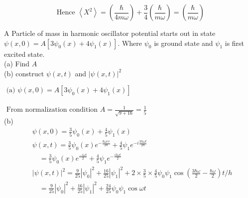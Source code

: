 \begin{enumerate}
\begin{answer}
$$\text { Hence }\left\langle X^{2}\right\rangle=\left(\frac{\hbar}{4 m \omega}\right)+\frac{3}{4}\left(\frac{\hbar}{m \omega}\right)=\left(\frac{\hbar}{m \omega}\right)$$
\end{answer}
	\begin{minipage}{\textwidth}
	\item A Particle of mass in harmonic oscillator potential starts out in state $\psi(x, 0)=A\left[3 \psi_{0}(x)+4 \psi_{1}(x)\right] .$ Where $\psi_{0}$ is ground state and $\psi_{1}$ is first excited state.\\
	(a) Find $A$\\
	(b) construct $\psi(x, t)$ and $|\psi(x, t)|^{2}$\\
\end{minipage}
\begin{answer}
	$\text { (a) } \psi(x, 0)=A\left[3 \psi_{0}(x)+4 \psi_{1}(x)\right]$\\\\
	$\text { From normalization condition } A=\frac{1}{\sqrt{9+16}}=\frac{1}{5}$\\
(b)	\begin{align*}
		&\psi(x, 0)=\frac{3}{5} \psi_{0}(x)+\frac{4}{5} \psi_{1}(x) \\
		&\psi(x, t)=\frac{3}{5} \psi_{0}(x) e^{-\frac{\hbar \omega e r}{2 \hbar}}+\frac{4}{5} \psi_{1} e^{-i \frac{3 h \omega t}{2 \hbar}} \\
		&\quad=\frac{3}{5} \psi_{0}(x) e^{\frac{-i \omega t}{2}}+\frac{4}{5} \psi_{1} e^{-\frac{i 3 \omega t}{2}} \\
		&|\psi(x, t)|^{2}=\frac{9}{25}\left|\psi_{0}\right|^{2}+\frac{16}{25}\left|\psi_{1}\right|^{2}+2 \times \frac{3}{5} \times \frac{4}{5} \psi_{0} \psi_{1} \cos \left(\frac{3 \hbar \omega}{2}-\frac{\hbar \omega}{2}\right) t / h \\
		&\quad=\frac{9}{25}\left|\psi_{0}\right|^{2}+\frac{16}{25}\left|\psi_{1}\right|^{2}+\frac{24}{25} \psi_{0} \psi_{1} \cos \omega t
	\end{align*}
\end{answer}
\end{enumerate}











